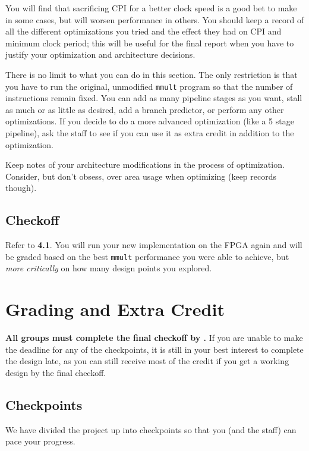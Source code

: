 \documentclass[11pt]{article}
\begin{document}
You will find that sacrificing CPI for a better clock speed is a good bet to make in some cases, but will worsen performance in others.
You should keep a record of all the different optimizations you tried and the effect they had on CPI and minimum clock period; this will be useful for the final report when you have to justify your optimization and architecture decisions.

There is no limit to what you can do in this section.
The only restriction is that you have to run the original, unmodified \verb|mmult| program so that the number of instructions remain fixed.
You can add as many pipeline stages as you want, stall as much or as little as desired, add a branch predictor, or perform any other optimizations.
If you decide to do a more advanced optimization (like a 5 stage pipeline), ask the staff to see if you can use it as extra credit in addition to the optimization.

Keep notes of your architecture modifications in the process of optimization.
Consider, but don't obsess, over area usage when optimizing (keep records though).

\subsection{Checkoff}
Refer to \textbf{4.1}. You will run your new implementation on the FPGA again and will be graded based on the best \verb|mmult| performance you were able to achieve, but \textit{more critically} on how many design points you explored.
\pagebreak

\section{Grading and Extra Credit}
\textbf{All groups must complete the final checkoff by \finalCheckoffDueDate.}
If you are unable to make the deadline for any of the checkpoints, it is still in your best interest to complete the design late, as you can still receive most of the credit if you get a working design by the final checkoff.

\subsection{Checkpoints}
\label{checkoff}
We have divided the project up into checkpoints so that you (and the staff) can pace your progress.
\end{document}
